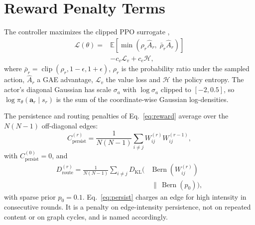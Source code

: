 \documentclass[11pt]{article}
\DeclareMathOperator{\Bern}{Bern}
\DeclareMathOperator*{\clip}{clip}
\begin{document}
\section{Reward Penalty Terms}
\label{app:penalties}

The controller maximizes the clipped PPO surrogate \citep{schulman2017ppo},
\begin{equation}
\begin{aligned}
\mathcal{L}(\theta)={}&
\mathbb{E}\!\left[\min\!\left(\rho_r\hat A_r,\;\bar\rho_r\hat A_r\right)\right]\\
&-c_v\mathcal{L}_v+c_e\mathcal{H},
\end{aligned}
\label{eq:ppo}
\end{equation}
where $\bar\rho_r=\clip(\rho_r,1-\epsilon,1+\epsilon)$, $\rho_r$ is the
probability ratio under the sampled action, $\hat A_r$ a GAE advantage,
$\mathcal{L}_v$ the value loss and $\mathcal{H}$ the policy entropy. The actor's
diagonal Gaussian has scale $\sigma_a$ with $\log\sigma_a$ clipped to
$[-2,0.5]$, so $\log\pi_\theta(\mathbf a_r\mid s_r)$ is the sum of the
coordinate-wise Gaussian log-densities.

The persistence and routing penalties of Eq.~\ref{eq:reward} average over the
$N(N{-}1)$ off-diagonal edges:
\begin{equation}
C^{(r)}_{\mathrm{persist}}
  =\frac{1}{N(N{-}1)}\sum_{i\neq j}W^{(r)}_{ij}W^{(r-1)}_{ij},
\label{eq:persist}
\end{equation}
with $C^{(0)}_{\mathrm{persist}}=0$, and
\begin{equation}
\begin{aligned}
D^{(r)}_{\mathrm{route}}
  =\frac{1}{N(N{-}1)}\sum_{i\neq j}
  D_{\mathrm{KL}}\bigl(&\Bern(W^{(r)}_{ij})\\[-2pt]
  &\,\|\,\Bern(p_0)\bigr),
\end{aligned}
\label{eq:kl}
\end{equation}
with sparse prior $p_0=0.1$. Eq.~\ref{eq:persist} charges an edge for high
intensity in consecutive rounds. It is a penalty on edge-intensity persistence,
not on repeated content or on graph cycles, and is named accordingly.

\end{document}
